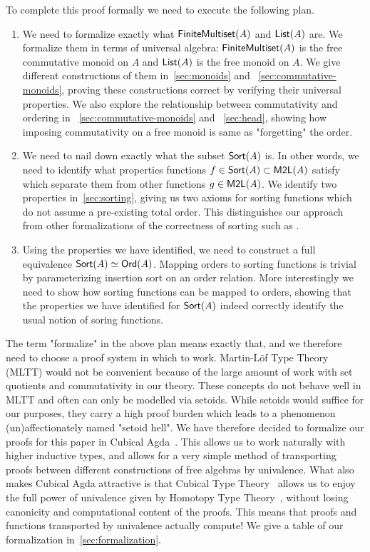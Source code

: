 To complete this proof formally we need to execute the following plan.
\begin{enumerate}
    \item We need to formalize exactly what $\operatorname{\mathsf{FiniteMultiset}}(A)$ and $\operatorname{\mathsf{List}}(A)$ are.
    We formalize them in terms of universal algebra: $\operatorname{\mathsf{FiniteMultiset}}(A)$ is 
    the free commutative monoid on $A$ and $\operatorname{\mathsf{List}}(A)$ is the free monoid on $A$. We give
    different constructions of them in~\cref{sec:monoids} and ~\cref{sec:commutative-monoids},
    proving these constructions correct by verifying their universal properties.
    We also explore the relationship between commutativity and ordering in
    ~\cref{sec:commutative-monoids} and ~\cref{sec:head},
    showing how imposing commutativity on a free monoid is same as "forgetting" the order.
    \item We need to nail down exactly what the subset $\operatorname{\mathsf{Sort}}(A)$ is. In other words, we need to
    identify what properties functions $f \in \operatorname{\mathsf{Sort}}(A) \subset \operatorname{\mathsf{M2L}}(A)$ satisfy which separate
    them from other functions $g \in \operatorname{\mathsf{M2L}}(A)$. We identify two properties in~\cref{sec:sorting},
    giving us two axioms for sorting functions which do not assume a pre-existing total order. This distinguishes our approach 
    from other formalizations of the correctness of sorting such as 
    \cite{appelVerifiedFunctionalAlgorithms2023}.
    \item Using the properties we have identified, we need to construct a full equivalence
    $\operatorname{\mathsf{Sort}}(A) \simeq \operatorname{\mathsf{Ord}}(A)$. Mapping orders to sorting functions is
    trivial by parameterizing insertion sort on an order relation. More interestingly we need to show how sorting functions
    can be mapped to orders, showing that the properties we have identified for $\operatorname{\mathsf{Sort}}(A)$ indeed
    correctly identify the usual notion of soring functions.
\end{enumerate}

The term "formalize" in the above plan means exactly that, and we therefore need to choose a proof system in which to work. Martin-L\"of Type Theory (MLTT) would not be convenient because of the large amount of work with set quotients and commutativity in our theory. These concepts do not behave well in MLTT and often can only be modelled via setoids. While setoids would suffice for
our purposes, they carry a high proof burden which leads to a
phenomenon (un)affectionately named "setoid hell". We have therefore decided to formalize our proofs
for this paper in Cubical Agda~\cite{vezzosiCubicalAgdaDependently2019}. This allows us to work  naturally with
higher inductive types, and allows for a very simple method of transporting proofs between
different constructions of free algebras by univalence. What also makes Cubical Agda attractive
is that Cubical Type Theory~\cite{cohenCubicalTypeTheory2018}
allows us to enjoy the full power of univalence given by
Homotopy Type Theory~\cite{univalentfoundationsprogramHomotopyTypeTheory2013}, 
without losing canonicity and computational content of the proofs. This means that proofs and functions
transported by univalence actually compute!
We give a table of our formalization in~\cref{sec:formalization}.

